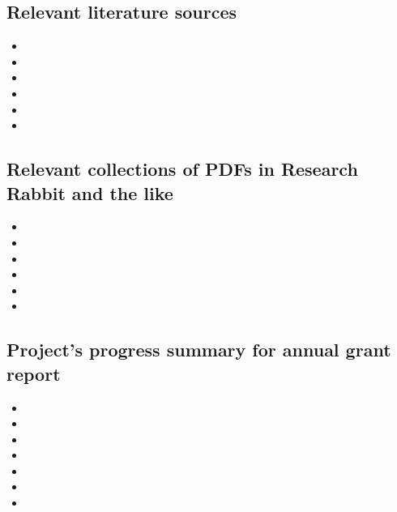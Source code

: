 \documentclass[11pt,letterpaper]{article}
\begin{document}
\subsection{Relevant literature sources}
\label{sec:org4a266d7}

\begin{itemize}
\item 

\item 

\item 

\item 

\item 

\item 
\end{itemize}

\subsection{Relevant collections of PDFs in Research Rabbit and the like}
\label{sec:org8197e5e}


\begin{itemize}
\item 

\item 

\item 

\item 

\item 

\item 
\end{itemize}


\subsection{Project's progress summary for annual grant report}
\label{sec:org43dbeda}

\begin{itemize}
\item 

\item 

\item 

\item 

\item 

\item 

\item 
\end{itemize}
\end{document}
